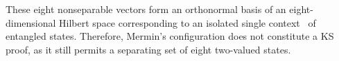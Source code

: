 \documentclass[
  twocolumn,
 showpacs,
 showkeys,
 preprintnumbers,
 amsmath,amssymb,
 aps,
 pra,
  longbibliography,
 floatfix,
 ]{revtex4-2}
\begin{document}
%
These eight nonseparable vectors form an orthonormal basis of an eight-dimensional Hilbert space corresponding to an isolated single context~\cite[Table~1]{svozil-2020-ghz} of  entangled states.
Therefore, Mermin's configuration does not constitute a KS proof, as it still permits a separating set of eight two-valued states.
\end{document}
